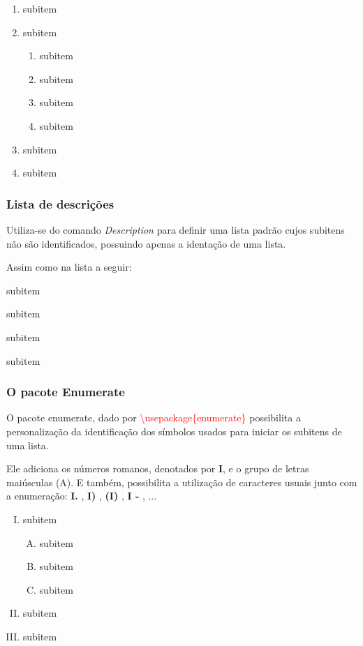 \documentclass{article}
\begin{document}
\begin{enumerate}
	\item subitem
	\item subitem
		\begin{enumerate}
			\item subitem
			\item subitem
			\item subitem
			\item subitem
		\end{enumerate}
	\item subitem
	\item subitem
\end{enumerate}

\subsubsection{Lista de descrições}

\begin{flushleft}
Utiliza-se do comando \textit{Description} para definir uma lista padrão cujos subitens não são identificados, possuindo apenas a identação de uma lista.
\vspace{0.2cm}

Assim como na lista a seguir:
\end{flushleft}

\begin{description}
	\item subitem
	\item subitem
	\item subitem
	\item subitem
\end{description}

\subsubsection{O pacote Enumerate}
\begin{flushleft}
O pacote enumerate, dado por \textcolor{red}{\textbackslash usepackage\{enumerate\}} possibilita a personalização da identificação dos símbolos usados para iniciar os subitens de uma lista. 

Ele adiciona os números romanos, denotados por \textbf{I}, e o grupo de letras maiúsculas (A). E também, possibilita a utilização de caracteres usuais junto com a enumeração: \textbf{I.} , \textbf{I)} , \textbf{(I)} , \textbf{I - } , ...
\end{flushleft}


\begin{enumerate}[I.]
	\item subitem
		\begin{enumerate}[A)]
			\item subitem
			\item subitem
			\item subitem
		\end{enumerate}
	\item subitem
	\item subitem
\end{enumerate}
\end{document}
